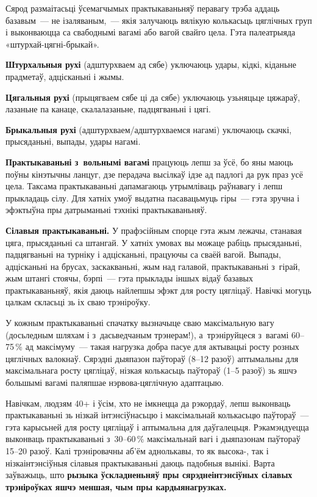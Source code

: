 Сярод размаітасьці ўсемагчымых практыкаваньняў перавагу трэба аддаць базавым~--- не ізаляваным,~--- якія залучаюць вялікую колькасьць цяглічных груп і выконваюцца са свабоднымі вагамі або вагой свайго цела. Гэта палеатрыяда «штурхай-цягні-брыкай». 

\textbf{Штурхальныя рухі} (адштурхваем ад сябе) уключаюць удары, кідкі, кіданьне прадметаў, адцісканьні і жымы. 

\textbf{Цягальныя рухі} (прыцягваем сябе ці да сябе) уключаюць узьняцьце цяжараў, лазаньне па канаце, скалалазаньне, падцягваньні і цягі. 

\textbf{Брыкальныя рухі} (адштурхваем/адштурхваемся нагамі) уключаюць скачкі, прысяданьні, выпады, удары нагамі. 

\textbf{Практыкаваньні з~вольнымі вагамі} працуюць лепш за ўсё, бо яны маюць поўны кінэтычны ланцуг, дзе перадача высілкаў ідзе ад падлогі да рук праз усё цела. Таксама практыкаваньні дапамагаюць утрымліваць раўнавагу і лепш прыкладаць сілу. Для хатніх умоў выдатна пасавацьмуць гіры~--- гэта зручна і эфэктыўна пры датрыманьні тэхнікі практыкаваньняў.

\textbf{Сілавыя практыкаваньні.} У прафэсійным спорце гэта жым лежачы, станавая цяга, прысяданьні са штангай. У хатніх умовах вы можаце рабіць прысяданьні, падцягваньні на турніку і адцісканьні, працуючы са сваёй вагой. Выпады, адцісканьні на брусах, заскакваньні, жым над галавой, практыкаваньні з~гірай, жым штангі стоячы, бэрпі~--- гэта прыклады іншых відаў базавых практыкаваньняў, якія даюць найлепшы эфэкт для росту цягліцаў. Навічкі могуць цалкам скласьці зь іх сваю трэніроўку. 


У кожным практыкаваньні спачатку вызначыце сваю максімальную вагу (досьледным шляхам і з~дасьведчаным трэнерам!), а~трэніруйцеся з~вагамі 60--75\,\% ад максімуму~--- такая нагрузка добра пасуе для актывацыі росту розных цяглічных валокнаў. Сярэдні дыяпазон паўтораў (8--12 разоў) аптымальны для максімальнага росту цягліцаў, нізкая колькасьць паўтораў (1--5 разоў) зь яшчэ большымі вагамі паляпшае нэрвова-цяглічную адаптацыю.

Навічкам, людзям 40+ і ўсім, хто не імкнецца да рэкордаў, лепш выконваць практыкаваньні зь нізкай інтэнсіўнасьцю і максімальнай колькасьцю паўтораў~--- гэта карысьней для росту цягліцаў і аптымальна для даўгалецьця. Рэкамэндуецца выконваць практыкаваньні з~30--60\,\% максімальнай вагі і дыяпазонам паўтораў 15--20 разоў. Калі трэніровачны аб'ём аднолькавы, то як высока-, так і нізкаінтэнсіўныя сілавыя практыкаваньні даюць падобныя вынікі. Варта заўважыць, што \textbf{рызыка ўскладненьняў пры сярэднеінтэнсіўных сілавых трэніроўках яшчэ меншая, чым пры кардыянагрузках.}

